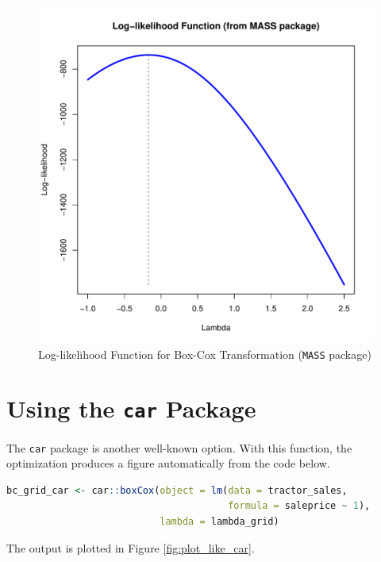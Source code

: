 \begin{figure}[h!]
  \centering
  \includegraphics[scale = 0.5, keepaspectratio=true]{../Figures/plot_like_MASS}
  \caption{Log-likelihood Function for Box-Cox Transformation (\texttt{MASS} package)} \label{fig:plot_like_MASS}
\end{figure}


\clearpage
\section*{Using the \texttt{car} Package}

The \texttt{car} package is another well-known option.
With this function, the optimization produces 
a figure automatically from the code below.

\begin{lstlisting}[language=R]
bc_grid_car <- car::boxCox(object = lm(data = tractor_sales,
                                       formula = saleprice ~ 1),
                           lambda = lambda_grid)
\end{lstlisting}

The output is plotted in Figure \ref{fig:plot_like_car}.

